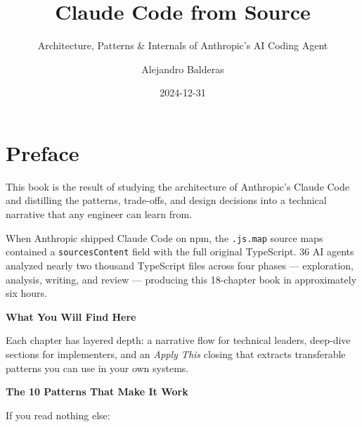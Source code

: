 \documentclass[
  english,
  11pt,
  letterpaper,
]{book}
\title{Claude Code from Source}
\subtitle{Architecture, Patterns \& Internals of Anthropic's AI Coding
Agent}
\author{Alejandro Balderas}
\date{2024-12-31}
\renewcommand*\contentsname{Table of contents}
\newcommand\contentsname{Table of contents}
\begin{document}
\frontmatter
\maketitle

\renewcommand*\contentsname{Table of contents}
{
\hypersetup{linkcolor=}
\setcounter{tocdepth}{1}
\tableofcontents
}

\mainmatter
{}

\chapter*{Preface}\label{preface}


This book is the result of studying the architecture of Anthropic's
Claude Code and distilling the patterns, trade-offs, and design
decisions into a technical narrative that any engineer can learn from.

When Anthropic shipped Claude Code on npm, the \texttt{.js.map} source
maps contained a \texttt{sourcesContent} field with the full original
TypeScript. 36 AI agents analyzed nearly two thousand TypeScript files
across four phases --- exploration, analysis, writing, and review ---
producing this 18-chapter book in approximately six hours.

\textbf{What You Will Find Here}

Each chapter has layered depth: a narrative flow for technical leaders,
deep-dive sections for implementers, and an \emph{Apply This} closing
that extracts transferable patterns you can use in your own systems.

\textbf{The 10 Patterns That Make It Work}

If you read nothing else:
\end{document}
